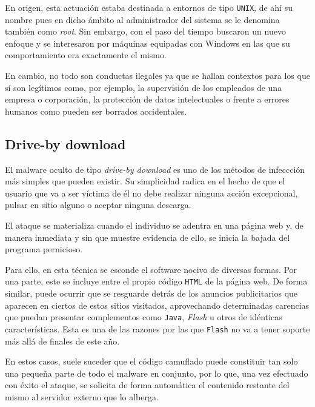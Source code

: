 \documentclass[12pt]{article}
\newcommand{\newpar} {
    \vskip 0.5cm
}
\begin{document}
            \newpar

            En origen, esta actuación estaba destinada a entornos de tipo \texttt{UNIX}, de ahí su nombre pues en dicho ámbito al administrador del sistema se le denomina también como \textit{root}. Sin embargo, con el paso del tiempo buscaron un nuevo enfoque y se interesaron por máquinas equipadas con Windows en las que su comportamiento era exactamente el mismo.

            \newpar

            En cambio, no todo son conductas ilegales ya que se hallan contextos para los que sí son legítimos como, por ejemplo, la supervisión de los empleados de una empresa o corporación, la protección de datos intelectuales o frente a errores humanos como pueden ser borrados accidentales.

        \subsection{Drive-by download}
            El malware oculto de tipo \textit{drive-by download} es uno de los métodos de infeccción más simples que pueden existir. Su simplicidad radica en el hecho de que el usuario que va a ser víctima de él no debe realizar ninguna acción excepcional, pulsar en sitio alguno o aceptar ninguna descarga.

            \newpar

            El ataque se materializa cuando el individuo se adentra en una página web y, de manera inmediata y sin que muestre evidencia de ello, se inicia la bajada del programa pernicioso.

            \newpar

            Para ello, en esta técnica se esconde el software nocivo de diversas formas. Por una parte, este se incluye entre el propio código \texttt{HTML} de la página web. De forma similar, puede ocurrir que se resguarde detrás de los anuncios publicitarios que aparecen en ciertos de estos sitios visitados, aprovechando determinadas carencias que puedan presentar complementos como \texttt{Java}, \textit{Flash} u otros de idénticas características. Esta es una de las razones por las que \texttt{Flash} no va a tener soporte más allá de finales de este año.

            \newpar

            En estos casos, suele suceder que el código camuflado puede constituir tan solo una pequeña parte de todo el malware en conjunto, por lo que, una vez efectuado con éxito el ataque, se solicita de forma automática el contenido restante del mismo al servidor externo que lo alberga.
\end{document}
